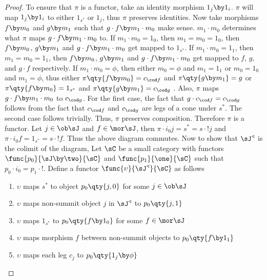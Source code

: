 \documentclass[main.tex]{subfiles}
\begin{document}
\begin{proof}
	To ensure that $\pi$ is a functor, take an identity morphism
	$1_{j}\by1_{i}$. $\pi$ will map $1_{j}\by1_{i}$ to either $1_{s^{*}}$ or
	$1_{j}$, thus $\pi$ preserves identities. Now take morphisms $f\by m_{0}$
	and $g\by m_{1}$ such that $g\cdot f \by m_{1}\cdot m_{0}$ make sense.
	$m_{1}\cdot m_{0}$ determines what $\pi$ maps $g\cdot f \by m_{1}\cdot
	m_{0}$ to. If $m_{1}\cdot m_{0} = 1_{0}$, then $m_{1} = m_{0} = 1_{0}$, then
	$f\by m_{0}$, $g\by m_{1}$ and $g\cdot f \by m_{1}\cdot m_{0}$ get mapped to
	$1_{s^{*}}$. If $m_{1}\cdot m_{0} = 1_{1}$, then $m_{1} = m_{0} = 1_{1}$,
	then $f\by m_{0}$, $g\by m_{1}$ and $g\cdot f \by m_{1}\cdot m_{0}$ get
	mapped to $f$, $g$, and $g\cdot f$ respectively. If  $m_{1}\cdot m_{0} =
	\phi$, then either $m_{0} = \phi$ and $m_{1} = 1_{1}$ or $m_{0} = 1_{0}$ and
	$m_{1} = \phi$, thus either $\pi\qty{ f\by m_{0} }= c_{\cod f}$ and
	$\pi\qty{ g\by m_{1} }= g$ or $\pi\qty{ f\by m_{0} }= 1_{s^{*}}$ and
	$\pi\qty{ g \by m_{1} }=  c_{\cod g}$  . Also, $\pi$ maps $g\cdot f \by
	m_{1}\cdot m_{0}$ to $c_{\cod g}$. For the first case, the fact that $g
	\cdot c_{\cod f} = c_{\cod g}$ follows from the fact that $c_{\cod f}$ and
	$c_{\cod g}$ are legs of a cone under $s^{*}$. The second case follows
	trivially. Thus, $\pi$ preserves composition. Therefore $\pi$ is a functor.
	Let $j \in \ob \sJ$ and $f \in \mor \sJ$, then $\pi \cdot i_{0}j  = s^{*} =
	s \cdot !j$ and $\pi \cdot i_{0}f  = 1_{s^{*}} = s \cdot !f$. Thus the above
	diagram commutes. Now to show that $\sJ^{\triangleleft}$ is the colimit of
	the diagram, Let $\sC$ be a small category with functors $\func{p_{0}}{\sJ
	\by \two}{\sC}$ and $\func{p_{1}}{\one}{\sC}$ such that $p_{0} \cdot i_{0} =
	p_{1} \cdot !  $. Define a functor
	$\func{\upsilon}{\sJ^{\triangleleft}}{\sC}$ as follows

	\begin{enumerate}
		\item $\upsilon$ maps $s^{*}$ to  object $p_{0}\qty{j,0}$ for some $j \in \ob \sJ$
		\item $\upsilon$ maps non-summit object $j$ in $\sJ^{\triangleleft}$ to $p_{0}\qty{j,1}$
		\item $\upsilon$ maps $1_{s^{*}}$ to  $p_{0}\qty{f\by1_{0}}$ for some $f \in \mor \sJ$
		\item $\upsilon$ maps morphism $f$ between non-summit objects to  $p_{0}\qty{f\by1_{1}}$
		\item $\upsilon$ maps each leg $c_{j}$ to $p_{0}\qty{1_{j}\by\phi}$
	\end{enumerate}


\end{proof}
\end{document}
